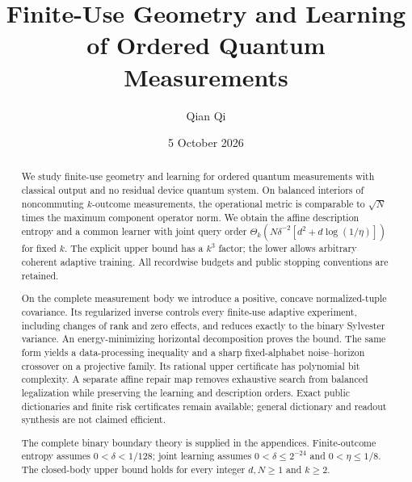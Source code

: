 \documentclass[11pt]{amsart}
\title[Finite-use measurement geometry and learning]{Finite-Use Geometry and Learning of Ordered Quantum Measurements}
\author{Qian Qi}
\date{5 October 2026}
\numberwithin{equation}{section}
\theoremstyle{definition}\newtheorem{definition}[theorem]{Definition}
\theoremstyle{remark}\newtheorem{remark}[theorem]{Remark}
\begin{document}
\raggedbottom
\begin{abstract}
We study finite-use geometry and learning for ordered quantum measurements
with classical output and no residual device quantum system.  On balanced
interiors of noncommuting $k$-outcome measurements, the operational metric
is comparable to $\sqrt N$ times the maximum component operator norm.
We obtain the affine description entropy and a common learner with joint
query order $\Theta_k(N\delta^{-2}[d^2+d\log(1/\eta)])$ for fixed $k$.
The explicit upper bound has a $k^3$ factor; the lower allows arbitrary
coherent adaptive training.  All recordwise budgets and public stopping
conventions are retained.

On the complete measurement body we introduce a positive, concave
normalized-tuple covariance.  Its regularized inverse controls every
finite-use adaptive experiment, including changes of rank and zero
effects, and reduces exactly to the binary Sylvester variance.  An
energy-minimizing horizontal decomposition proves the bound.  The same
form yields a data-processing inequality and a sharp fixed-alphabet
noise--horizon crossover on a projective family.  Its rational upper
certificate has polynomial bit complexity.  A separate affine repair
map removes exhaustive search from balanced legalization while preserving
the learning and description orders.  Exact public dictionaries and
finite risk certificates remain available; general dictionary and
readout synthesis are not claimed efficient.

The complete binary boundary theory is supplied in the appendices.
Finite-outcome entropy assumes $0<\delta<1/128$; joint learning assumes
$0<\delta\le2^{-24}$ and $0<\eta\le1/8$.  The closed-body upper bound
holds for every integer $d,N\ge1$ and $k\ge2$.
\end{abstract}
\maketitle






\appendix



















\end{document}
